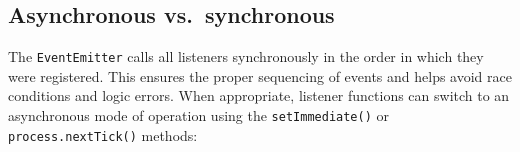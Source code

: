 \begin{Shaded}
\begin{Highlighting}[]
  \OperatorTok{=} \NormalTok{(}\NormalTok{)}\OperatorTok{;}
 \NormalTok{ \{\}}
\OperatorTok{=}  \NormalTok{()}\OperatorTok{;}
\NormalTok{(}\OperatorTok{,}\OperatorTok{,}\KeywordTok{=\textgreater{}}\NormalTok{ \{}
  \OperatorTok{,}\OperatorTok{,} \NormalTok{)}\OperatorTok{;}
\NormalTok{\})}\OperatorTok{;}
\NormalTok{(}\OperatorTok{,} \OperatorTok{,} \NormalTok{)}\OperatorTok{;}
\end{Highlighting}
\end{Shaded}

\subsection{Asynchronous
vs.~synchronous}\label{asynchronous-vs.-synchronous}

The \texttt{EventEmitter} calls all listeners synchronously in the order
in which they were registered. This ensures the proper sequencing of
events and helps avoid race conditions and logic errors. When
appropriate, listener functions can switch to an asynchronous mode of
operation using the \texttt{setImmediate()} or
\texttt{process.nextTick()} methods:

